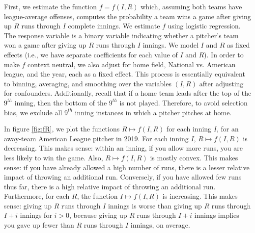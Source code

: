 \documentclass[12pt]{article}
\begin{document}
First, we estimate the function $f=f(I,R)$ which, assuming both teams have league-average offenses, computes the probability a team wins a game after giving up $R$ runs through $I$ complete innings. We estimate $f$ using logistic regression. The response variable is a binary variable indicating whether a pitcher's team won a game after giving up $R$ runs through $I$ innings. We model $I$ and $R$ as fixed effects (i.e., we have separate coefficients for each value of $I$ and $R$). In order to make $f$ context neutral, we also adjust for home field, National vs. American league, and the year, each as a fixed effect. This process is essentially equivalent to binning, averaging, and smoothing over the variables $(I,R)$ after adjusting for confounders. Additionally, recall that if a home team leads after the top of the $9^{th}$ inning, then the bottom of the $9^{th}$ is not played. Therefore, to avoid selection bias, we exclude all $9^{th}$ inning instances in which a pitcher pitches at home.


In figure \ref{fig:fR}, we plot the functions $R \mapsto f(I,R)$ for each inning $I$, for an away-team American League pitcher in 2019. For each inning $I$, $R \mapsto f(I,R)$ is decreasing. This makes sense: within an inning, if you allow more runs, you are less likely to win the game. Also, $R \mapsto f(I,R)$ is mostly convex. This makes sense: if you have already allowed a high number of runs, there is a lesser relative impact of throwing an additional run. Conversely, if you have allowed few runs thus far, there is a high relative impact of throwing an additional run. Furthermore, for each $R$, the function $I \mapsto f(I,R)$ is increasing. This makes sense: giving up $R$ runs through $I$ innings is worse than giving up $R$ runs through $I+i$ innings for $i > 0$, because giving up $R$ runs through $I+i$ innings implies you gave up fewer than $R$ runs through $I$ innings, on average.
\end{document}
